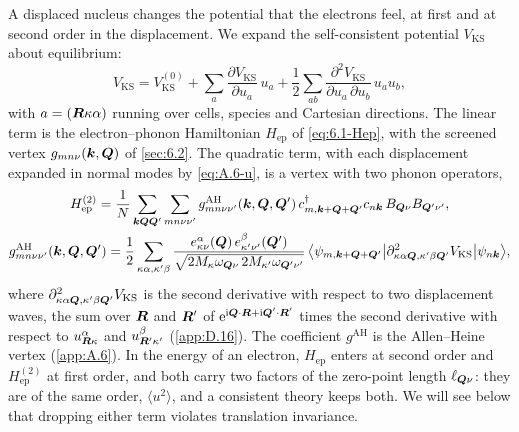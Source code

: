 A displaced nucleus changes the potential that the electrons feel, at first and at second order in the displacement. We expand the self-consistent potential $V_{\mathrm{KS}}$ about equilibrium:
\begin{equation*}
  V_{\mathrm{KS}} = V^{(0)}_{\mathrm{KS}} + \sum_a\frac{\partial V_{\mathrm{KS}}}{\partial u_a}\,u_a + \frac12\sum_{ab}\frac{\partial^2V_{\mathrm{KS}}}{\partial u_a\,\partial u_b}\,u_au_b ,
\end{equation*}
with $a = (\bm{R}\kappa\alpha)$ running over cells, species and Cartesian directions. The linear term is the electron--phonon Hamiltonian $H_{\mathrm{ep}}$ of \cref{eq:6.1-Hep}, with the screened vertex $g_{mn\nu}(\bm{k},\bm{Q})$ of \cref{sec:6.2}. The quadratic term, with each displacement expanded in normal modes by \cref{eq:A.6-u}, is a vertex with two phonon operators,
\begin{equation}
  \begin{gathered}
  H^{(2)}_{\mathrm{ep}} = \frac1N\sum_{\bm{k}\bm{Q}\bm{Q}'}\sum_{mn\nu\nu'}g^{\mathrm{AH}}_{mn\nu\nu'}(\bm{k},\bm{Q},\bm{Q}')\,c^\dagger_{m,\bm{k}+\bm{Q}+\bm{Q}'}c_{n\bm{k}}\,B_{\bm{Q}\nu}B_{\bm{Q}'\nu'} , \\
  g^{\mathrm{AH}}_{mn\nu\nu'}(\bm{k},\bm{Q},\bm{Q}') = \frac{1}{2}\sum_{\kappa\alpha,\kappa'\beta}\frac{e^\alpha_{\kappa\nu}(\bm{Q})\,e^\beta_{\kappa'\nu'}(\bm{Q}')}{\sqrt{2M_\kappa\omega_{\bm{Q}\nu}\,2M_{\kappa'}\omega_{\bm{Q}'\nu'}}}\,\bigl\langle\psi_{m,\bm{k}+\bm{Q}+\bm{Q}'}\big|\partial^2_{\kappa\alpha\bm{Q},\kappa'\beta\bm{Q}'}V_{\mathrm{KS}}\big|\psi_{n\bm{k}}\bigr\rangle ,
  \end{gathered}
  \label{eq:6.3-HAH}
\end{equation}
where $\partial^2_{\kappa\alpha\bm{Q},\kappa'\beta\bm{Q}'}V_{\mathrm{KS}}$ is the second derivative with respect to two displacement waves, the sum over $\bm{R}$ and $\bm{R}'$ of $\mathrm{e}^{\mathrm{i}\bm{Q}\cdot\bm{R}+\mathrm{i}\bm{Q}'\cdot\bm{R}'}$ times the second derivative with respect to $u^\alpha_{\bm{R}\kappa}$ and $u^\beta_{\bm{R}'\kappa'}$ (\cref{app:D.16}). The coefficient $g^{\mathrm{AH}}$ is the Allen--Heine vertex (\cref{app:A.6}). In the energy of an electron, $H_{\mathrm{ep}}$ enters at second order and $H^{(2)}_{\mathrm{ep}}$ at first order, and both carry two factors of the zero-point length $\ell_{\bm{Q}\nu}$: they are of the same order, $\langle u^2\rangle$, and a consistent theory keeps both. We will see below that dropping either term violates translation invariance.

